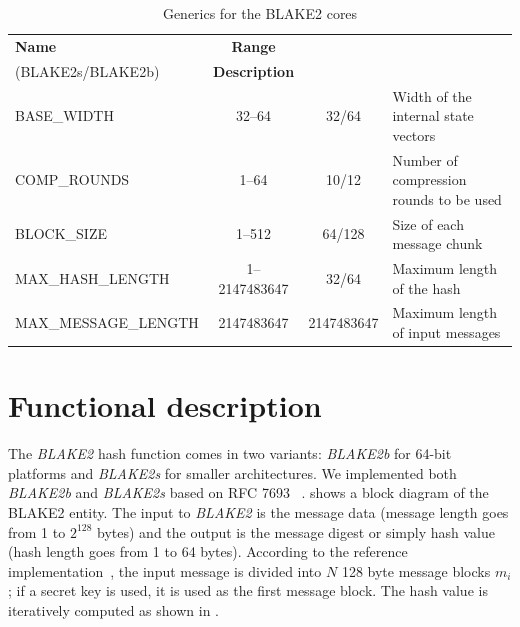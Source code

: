 \documentclass[%
	a4paper,
]
{article}
\newcommand{\todo}[1]{\textcolor{red}{#1}}
\newcommand{\done}[1]{}
\begin{document}
\begin{table}[tb]

	\centering
	\caption{Generics for the BLAKE2 cores}	
	\label{tbl:blake2-generics}
	\renewcommand{\arraystretch}{2}
	\begin{tabular}{l|c|c|m{3cm}}
	\hline
	\textbf{Name}
	& \textbf{Range}
	&	\begin{minipage}[c]{3cm}%
				\textbf{Default value} \\
				(BLAKE2s/BLAKE2b)%
			\end{minipage}%
	& \textbf{Description}
	\\\hline

	BASE_WIDTH
	& 32--64
	& 32/64
	& Width of the internal state vectors
	\\\hline

	COMP_ROUNDS
	& 1--64
	& 10/12
	&	Number of compression rounds to be used
	\\\hline

	BLOCK_SIZE
	& 1--512
	& 64/128
	&	Size of each message chunk
	\\\hline

	MAX_HASH_LENGTH
	& 1--2147483647
	& 32/64
	&	Maximum length of the hash
	\\\hline

	MAX_MESSAGE_LENGTH
	& 2147483647
	& 2147483647
	& Maximum length of input messages
	\\\hline

	\end{tabular}

\end{table}
%
%
\section{Functional description}
\label{sec:implementation}

\done{Include a block diagram of the top-level entities here, ideally
created with TikZ.}

The \emph{BLAKE2} hash function comes in two variants: \emph{BLAKE2b} for
64-bit platforms and \emph{BLAKE2s} for smaller architectures.
%
We implemented both \emph{BLAKE2b} and \emph{BLAKE2s} based on RFC 7693~%
\autocite{rfc7693}.	
%
 shows a block diagram of the BLAKE2 entity.
%
The input to \emph{BLAKE2} is the message data (message
length goes from 1 to $2^{128}$ bytes) and the output is the message digest or
simply hash value (hash length goes from 1 to 64 bytes).
%
According to the reference implementation~\autocite[16-26]{rfc7693}, the input message is
divided into $N$ 128 byte message blocks $m_i$; if a secret key is used, it is
used as the first message block. 
%
%
The hash value is iteratively computed as shown in .
\end{document}
